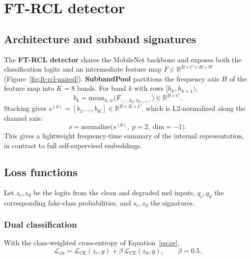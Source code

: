 \section{FT-RCL detector}
\label{sec:ftrcl}

\subsection{Architecture and subband signatures}

The \textbf{FT-RCL detector} shares the MobileNet backbone and exposes both the classification logits and an intermediate feature map $F \in \mathbb{R}^{B \times C \times H \times W}$ (Figure~\ref{fig:ft-rcl-paired}). \textbf{SubbandPool} partitions the frequency axis $H$ of the feature map into $K=8$ bands. For band $k$ with rows $[h_k, h_{k+1})$,
\begin{equation}
b_k = \mathrm{mean}_{h,w}\big(F_{:,:,h_k:h_{k+1},:}\big) \in \mathbb{R}^{B \times C}.
\label{eq:subband}
\end{equation}
Stacking gives $s^{(0)} = [b_1, \ldots, b_K] \in \mathbb{R}^{B \times K \times C}$, which is L2-normalized along the channel axis:
\begin{equation}
s = \mathrm{normalize}\big(s^{(0)},\ p=2,\ \mathrm{dim}=-1\big).
\label{eq:signature}
\end{equation}
This gives a lightweight frequency-time summary of the internal representation, in contrast to full self-supervised embeddings.



\subsection{Loss functions}
\label{sec:losses}

Let $z_c, z_d$ be the logits from the clean and degraded mel inputs, $q_c, q_d$ the corresponding fake-class probabilities, and $s_c, s_d$ the signatures.

\subsubsection{Dual classification}

With the class-weighted cross-entropy of Equation~\eqref{eq:ce},
\begin{equation}
\mathcal{L}_{\mathrm{cls}} = \mathcal{L}_{\mathrm{CE}}(z_c, y) + \beta\,\mathcal{L}_{\mathrm{CE}}(z_d, y), \qquad \beta = 0.5 .
\label{eq:cls}
\end{equation}

